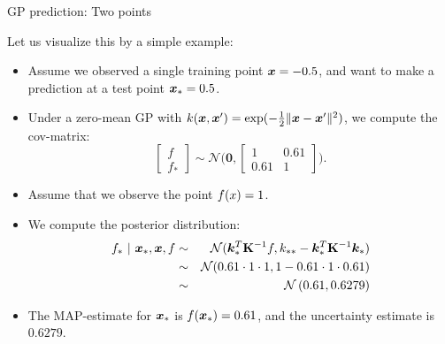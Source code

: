 \begin{frame}{GP prediction: Two points}

Let us visualize this by a simple example: 
\begin{itemize}
  \item Assume we observed a single training point $\bm{x} = - 0.5$, and want to make a prediction at a test point $\bm{x}_* = 0.5$. 
  \item Under a zero-mean GP with $k(\bm{x}, \bm{x}^\prime) = \exp(-\frac{1}{2}\|\bm{x} - \bm{x}^\prime\|^2)$, we compute the cov-matrix:
  $$
    \begin{bmatrix} f \\ f_* \end{bmatrix} \sim \mathcal{N}\biggl(\bm{0}, \begin{bmatrix} 1 & 0.61 \\ 0.61 & 1\end{bmatrix}\biggr). 
  $$ 
  \item Assume that we observe the point $f(x) = 1$. 
  \item We compute the posterior distribution: 
  \begin{eqnarray*}
    f_* ~|~ \bm{x}_*, \bm{x}, f &\sim& \mathcal{N}(\bm{k}_{*}^{T}\mathbf{K}^{-1}f, k_{**} - \bm{k}_*^T \mathbf{K}^{-1}\bm{k}_*) \\
    &\sim& \mathcal{N}(0.61 \cdot 1 \cdot 1, 1 - 0.61 \cdot 1 \cdot 0.61) \\
    &\sim& \mathcal{N}\left(0.61, 0.6279\right) 
  \end{eqnarray*}
  \item The MAP-estimate for $\bm{x}_*$ is $f(\bm{x}_*) = 0.61$, and the uncertainty estimate is $0.6279$. 


\end{itemize}

\end{frame} 


